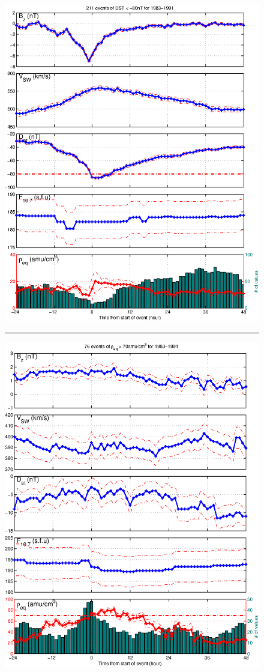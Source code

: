 \documentclass[10pt,twocolumn]{article}
\begin{document}
\begin{figure}[tp!]
\centering
\includegraphics[scale=0.40]{paperfigures/stormavs-d80.eps}
\rule[1ex]{5cm}{1pt}
\includegraphics[scale=0.40]{paperfigures/stormavs-m70.eps}

\end{figure}
\end{document}
